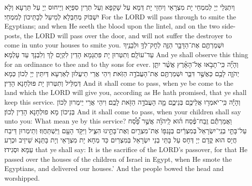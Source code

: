 {{}
{וְיִתְגְּלֵי יְיָ לְמִמְחֵי יָת מִצְרָאֵי וְיִחְזֵי יָת דְּמָא עַל שָׁקְפָא וְעַל תְּרֵין סִפַּיָּא וְיֵיחוּס יְיָ עַל תַּרְעָא וְלָא יִשְׁבּוֹק מְחַבְּלָא לְמֵיעַל לְבָתֵּיכוֹן לְמִמְחֵי׃}
{For the LORD will pass through to smite the Egyptians; and when He seeth the blood upon the lintel, and on the two side-posts, the LORD will pass over the door, and will not suffer the destroyer to come in unto your houses to smite you.}{}
{וּשְׁמַרְתֶּ֖ם אֶת־הַדָּבָ֣ר הַזֶּ֑ה לְחׇק־לְךָ֥ וּלְבָנֶ֖יךָ עַד־עוֹלָֽם׃}
{וְתִטְּרוּן יָת פִּתְגָמָא הָדֵין לִקְיָם לָךְ וְלִבְנָךְ עַד עָלְמָא׃}
{And ye shall observe this thing for an ordinance to thee and to thy sons for ever.}{}
{וְהָיָ֞ה כִּֽי־תָבֹ֣אוּ אֶל־הָאָ֗רֶץ אֲשֶׁ֨ר יִתֵּ֧ן יְהֹוָ֛ה לָכֶ֖ם כַּאֲשֶׁ֣ר דִּבֵּ֑ר וּשְׁמַרְתֶּ֖ם אֶת־הָעֲבֹדָ֥ה הַזֹּֽאת׃
}
{וִיהֵי אֲרֵי תֵיעֲלוּן לְאַרְעָא דְּיִתֵּין יְיָ לְכוֹן כְּמָא דְּמַלֵּיל וְתִטְּרוּן יָת פּוּלְחָנָא הָדֵין׃}
{And it shall come to pass, when ye be come to the land which the LORD will give you, according as He hath promised, that ye shall keep this service.}{}
{וְהָיָ֕ה כִּֽי־יֹאמְר֥וּ אֲלֵיכֶ֖ם בְּנֵיכֶ֑ם מָ֛ה הָעֲבֹדָ֥ה הַזֹּ֖את לָכֶֽם׃}
{וִיהֵי אֲרֵי יֵימְרוּן לְכוֹן בְּנֵיכוֹן מָא פוּלְחָנָא הָדֵין לְכוֹן׃}
{And it shall come to pass, when your children shall say unto you: What mean ye by this service?}{}
{וַאֲמַרְתֶּ֡ם זֶֽבַח־פֶּ֨סַח ה֜וּא לַֽיהֹוָ֗ה אֲשֶׁ֣ר פָּ֠סַ֠ח עַל־בָּתֵּ֤י בְנֵֽי־יִשְׂרָאֵל֙ בְּמִצְרַ֔יִם בְּנׇגְפּ֥וֹ אֶת־מִצְרַ֖יִם וְאֶת־בָּתֵּ֣ינוּ הִצִּ֑יל וַיִּקֹּ֥ד הָעָ֖ם וַיִּֽשְׁתַּחֲוֽוּ׃
}
{וְתֵימְרוּן דֵּיבַח חֲיָס הוּא קֳדָם יְיָ דְּחָס עַל בָּתֵּי בְנֵי יִשְׂרָאֵל בְּמִצְרַיִם כַּד מְחָא יָת מִצְרָאֵי וְיָת בָּתַּנָא שֵׁיזֵיב וּכְרַע עַמָּא וּסְגִידוּ׃}
{that ye shall say: It is the sacrifice of the LORD’s passover, for that He passed over the houses of the children of Israel in Egypt, when He smote the Egyptians, and delivered our houses.’ And the people bowed the head and worshipped.}{}
}

